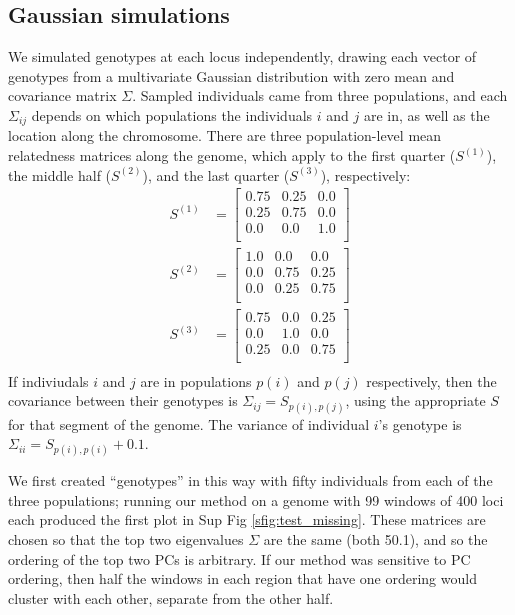 \documentclass[11pt, oneside]{article}   	%
\newcommand{\SFigure}{Sup Fig }
\newcommand{\SFigure}{{Supplementary Figure }}
\renewcommand{\llabel}[1]{\relax}
\begin{document}
\subsection{Gaussian simulations}
\label{apx:gaussian_sims}

We simulated genotypes at each locus independently,
drawing each vector of genotypes from a multivariate Gaussian distribution
with zero mean and covariance matrix $\Sigma$.
Sampled individuals came from three populations,
and each $\Sigma_{ij}$ depends on which populations the individuals $i$ and $j$ are in,
as well as the location along the chromosome.
There are three population-level mean relatedness matrices along the genome,
which apply to the first quarter ($S^{(1)}$),
the middle half ($S^{(2)}$),
and the last quarter ($S^{(3)}$), respectively:
\begin{align*}
    S^{(1)} &= 
    \begin{bmatrix}
        0.75 &  0.25 &  0.0 \\
        0.25 &  0.75 &  0.0 \\
        0.0  &  0.0  &  1.0 \\
    \end{bmatrix} \\
    S^{(2)} &= 
    \begin{bmatrix}
        1.0  &  0.0  &  0.0 \\
        0.0  &  0.75 &  0.25\\
        0.0  &  0.25 &  0.75\\
    \end{bmatrix} \\
    S^{(3)} &= 
    \begin{bmatrix}
        0.75 &  0.0  &  0.25\\
        0.0  &  1.0  &  0.0 \\
        0.25 &  0.0  &  0.75\\
    \end{bmatrix} \\
\end{align*}
If indiviudals $i$ and $j$ are in populations $p(i)$ and $p(j)$ respectively,
then the covariance between their genotypes is $\Sigma_{ij} = S_{p(i),p(j)}$, 
using the appropriate $S$ for that segment of the genome.
The variance of individual $i$'s genotype is $\Sigma_{ii} = S_{p(i),p(i)} + 0.1$.

We first created ``genotypes'' in this way with fifty individuals from each of the three populations;
running our method on a genome with 99 windows of 400 loci each
produced the first plot in \SFigure \ref{sfig:test_missing}.
These matrices are chosen so that the top two eigenvalues $\Sigma$ are the same (both 50.1),
and so the ordering of the top two PCs is arbitrary.
If our method was sensitive to PC ordering,
then half the windows in each region that have one ordering would cluster with each other,
separate from the other half. \llabel{ll:pc_switching_test}
\end{document}
